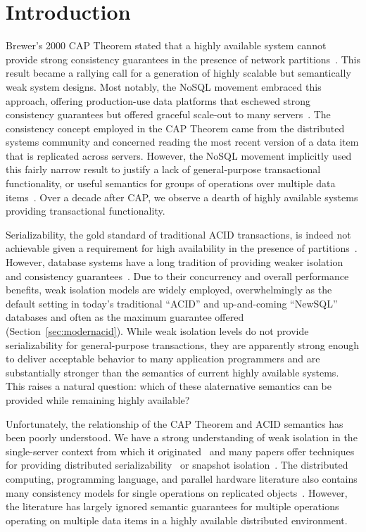 
\section{Introduction}

Brewer's 2000 CAP Theorem stated that a highly available system cannot
provide strong consistency guarantees in the presence of network
partitions~\cite{gilbert-cap}. This result became a rallying call for
a generation of highly scalable but semantically weak system
designs. Most notably, the NoSQL movement embraced this approach,
offering production-use data platforms that eschewed strong
consistency guarantees but offered graceful scale-out to many
servers~\cite{bigtable, pnuts, dynamo}. The consistency concept
employed in the CAP Theorem came from the distributed systems
community and concerned reading the most recent version of a data item
that is replicated across servers.  However, the NoSQL movement
implicitly used this fairly narrow result to justify a lack of
general-purpose transactional functionality, or useful semantics for
groups of operations over multiple data items~\cite{hn,
  foundation-article}. Over a decade after CAP, we observe a dearth of
highly available systems providing transactional functionality.

Serializability, the gold standard of traditional ACID transactions,
is indeed not achievable given a requirement for high availability in
the presence of partitions~\cite{davidson-survey}. However, database
systems have a long tradition of providing weaker isolation and
consistency guarantees~\cite{adya, ansicritique, gray-isolation}. Due
to their concurrency and overall performance benefits, weak isolation
models are widely employed, overwhelmingly as the default setting in
today's traditional ``ACID'' and up-and-coming ``NewSQL'' databases
and often as the maximum guarantee offered
(Section~\ref{sec:modernacid}). While weak isolation levels do not
provide serializability for general-purpose transactions, they are
apparently strong enough to deliver acceptable behavior to many
application programmers and are substantially stronger than the
semantics of current highly available systems. This raises a natural
question: which of these alaternative semantics can be provided while
remaining highly available?

Unfortunately, the relationship of the CAP Theorem and ACID semantics
has been poorly understood. We have a strong understanding of weak
isolation in the single-server context from which it
originated~\cite{adya, ansicritique, gray-isolation} and many papers
offer techniques for providing distributed
serializability~\cite{bernstein-concurrency, spanner, granola,
  daudjee-session, krikellas-bargain, calvin} or snapshot
isolation~\cite{daudjee-snapshot,generalizedsnapshot, kemme-snapshot,
  walter}. The distributed computing, programming language, and
parallel hardware literature also contains many consistency models for
single operations on replicated objects~\cite{pnuts, herlihy-art,
  cops, eiger, cac, sessionguarantees}. However, the literature has
largely ignored semantic guarantees for multiple operations operating
on multiple data items in a highly available distributed environment.


